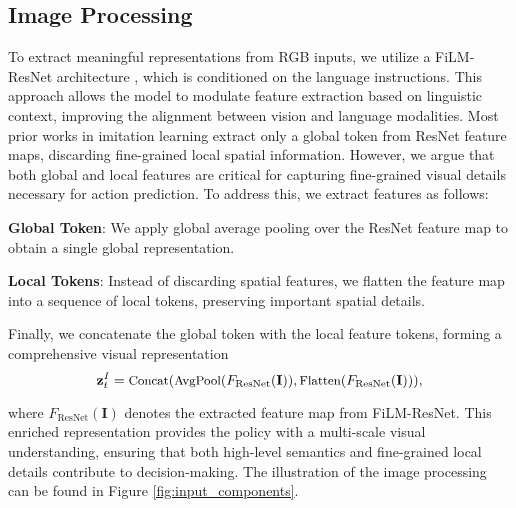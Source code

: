 \subsection{Image Processing}
\label{sec:rgb_processing}
To extract meaningful representations from RGB inputs, we utilize a FiLM-ResNet architecture \cite{perez2018film}, which is conditioned on the language instructions. This approach allows the model to modulate feature extraction based on linguistic context, improving the alignment between vision and language modalities.
Most prior works \cite{chi2023diffusion,zhao2023learning,reuss2024multimodal} in imitation learning extract only a global token from ResNet \cite{he2016deep} feature maps, discarding fine-grained local spatial information. However, we argue that both global and local features are critical for capturing fine-grained visual details necessary for action prediction.
To address this, we extract features as follows:


\textbf{Global Token}: We apply global average pooling over the ResNet feature map to obtain a single global representation.

\textbf{Local Tokens}: Instead of discarding spatial features, we flatten the feature map into a sequence of local tokens, preserving important spatial details.

Finally, we concatenate the global token with the local feature tokens, forming a comprehensive visual representation
\begin{equation}
\small
    \mathbf{z}^I_t = \text{Concat}(\text{AvgPool}(F_{\text{ResNet}}(\mathbf{I})), \text{Flatten}(F_{\text{ResNet}}(\mathbf{I}))),
\end{equation}

where $F_{\text{ResNet}}(\mathbf{I})$ denotes the extracted feature map from FiLM-ResNet.
This enriched representation provides the policy with a multi-scale visual understanding, ensuring that both high-level semantics and fine-grained local details contribute to decision-making. The illustration of the image processing can be found in Figure \ref{fig:input_components}.


